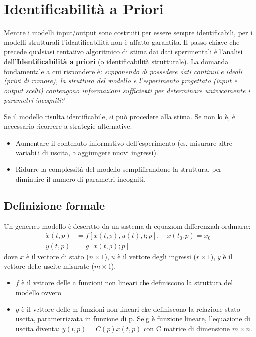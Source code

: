 \section{Identificabilità a Priori}

Mentre i modelli input/output sono costruiti per essere sempre identificabili, per i modelli strutturali l'identificabilità non è affatto garantita. 
Il passo chiave che precede qualsiasi tentativo algoritmico di stima dai dati sperimentali è l'analisi dell'\textbf{Identificabilità a priori} (o identificabilità strutturale). La domanda fondamentale a cui rispondere è: \textit{supponendo di possedere dati continui e ideali (privi di rumore), la struttura del modello e l'esperimento progettato (input e output scelti) contengono informazioni sufficienti per determinare univocamente i parametri incogniti?}

Se il modello risulta identificabile, si può procedere alla stima. Se non lo è, è necessario ricorrere a strategie alternative:
\begin{itemize}
    \item Aumentare il contenuto informativo dell'esperimento (es. misurare altre variabili di uscita, o aggiungere nuovi ingressi).
    \item Ridurre la complessità del modello semplificandone la struttura, per diminuire il numero di parametri incogniti.
\end{itemize}

\subsection{Definizione formale}
Un generico modello è descritto da un sistema di equazioni differenziali ordinarie:
\begin{align}
\dot{x}(t, p) &= f[x(t, p), u(t), t; p], \quad x(t_0, p) = x_0 \\
y(t, p) &= g[x(t, p); p]
\end{align}
dove $x$ è il vettore di stato ($n \times 1$), $u$ è il vettore degli ingressi ($r \times 1$), $y$ è il vettore delle uscite misurate ($m \times 1$).
\begin{itemize}
    \item $f$ è il vettore delle n funzioni non lineari che definiscono la struttura del modello ovvero
    \item $g$ è il vettore delle m funzioni non lineari che definiscono la relazione stato-uscita, parametrizzata in funzione di p. Se g è funzione lineare, l'equazione di uscita diventa: $y(t,p) = C(p)x(t,p)$ con C matrice di dimensione $m \times n$.
\end{itemize} 

